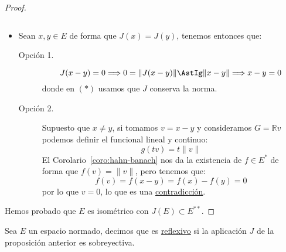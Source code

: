 \begin{prop}
\begin{proof}
\begin{itemize}
\begin{equation*}
                \end{equation*}
            \item Sean $x,y\in E$ de forma que $J(x) = J(y)$, tenemos entonces que:
                \begin{description}
                    \item [Opción 1.] 
                        \begin{equation*}
                            J(x-y) = 0 \Longrightarrow 0 = \|J(x-y)\| \AstIg\|x-y\| \Longrightarrow x-y = 0
                        \end{equation*}
                        donde en $(\ast)$ usamos que $J$ conserva la norma.
                    \item [Opción 2.] Supuesto que $x\neq y$, si tomamos $v=x-y$ y consideramos $G = \mathbb{R} v$ podemos definir el funcional lineal y continuo:
                        \begin{equation*}
                            g(tv) = t\|v\|
                        \end{equation*}
                        El Corolario~\ref{coro:hahn-banach} nos da la existencia de $f\in E^\ast$ de forma que \newline$f(v) = \|v\|$, pero tenemos que:
                        \begin{equation*}
                            f(v) = f(x-y) = f(x) - f(y) = 0
                        \end{equation*}
                        por lo que $v=0$, lo que es una \underline{contradicción}.
                \end{description}
        \end{itemize}
        Hemos probado que $E$ es isométrico con $J(E)\subset E^{\ast\ast}$.
    \end{proof}
\end{prop}

\begin{definicion}
    Sea $E$ un espacio normado, decimos que es \underline{reflexivo} si la aplicación $J$ de la proposición anterior es sobreyectiva.
\end{definicion}
